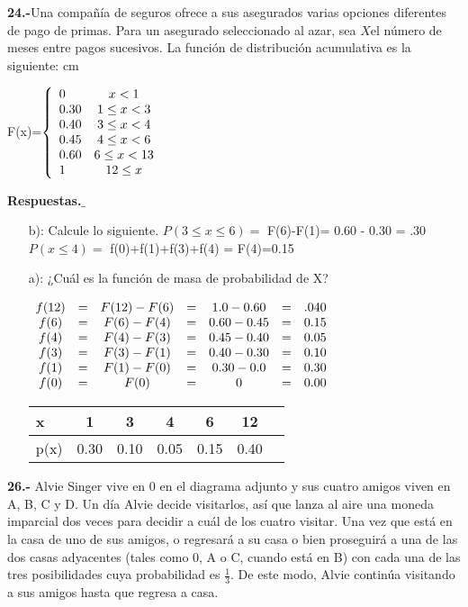 \documentclass[12pt, letterpaper, spanish]{article}
\newcommand{\jump}{\vskip 0.01cm}
\begin{document}
\textbf{24.-}Una compañía de seguros ofrece a sus asegurados varias opciones diferentes de pago de primas. Para un asegurado seleccionado al azar, sea $X$el número de meses entre pagos sucesivos. La función de distribución acumulativa es la siguiente: cm
\begin{center}
F(x)=$\left\{\begin{array}{l c}
    0 & x<1\\
    0.30 & 1 \leq x < 3\\
    0.40 & 3 \leq x < 4\\
    0.45 & 4 \leq x < 6\\
    0.60 & 6 \leq x < 13\\
    1    & 12 \leq x\\
\end{array}\right.$
\end{center} \jump
\textbf{Respuestas.$\_$}\jump
\begin{itemize}
    \item[b):] Calcule lo siguiente.
    \jump $P(3\leq x \leq 6) =$ F(6)-F(1)= 0.60 - 0.30 = .30
    \jump $P(x \leq 4) =$ f(0)+f(1)+f(3)+f(4) = F(4)=0.15
    \item[a):] ¿Cuál es la función de masa de probabilidad de X?
    \jump \begin{center} $\begin{array}{c c c c c c c}
        f(12)&=&F(12)-F(6)&=&1.0 - 0.60&=&.040\\
        f(6)&=&F(6)-F(4)&=&0.60 - 0.45&=&0.15\\
        f(4)&=&F(4)-F(3)&=&0.45 - 0.40&=&0.05\\
        f(3)&=&F(3)-F(1)&=&0.40 - 0.30&=&0.10\\
        f(1)&=&F(1)-F(0)&=&0.30 - 0.0&=&0.30\\
        f(0)&=&F(0)&=&0 &=&0.00\\
    \end{array}$  \jump
    \begin{tabular}{l|c c c c c c}
        x&1&3&4&6&12\\
        \hline
        p(x)&0.30&0.10&0.05&0.15&0.40\\
    \end{tabular}
\end{center}
\end{itemize}
\textbf{26.-} Alvie Singer vive en 0 en el diagrama adjunto y sus cuatro amigos viven en A, B, C y D. Un día Alvie decide visitarlos, así que lanza al aire una moneda imparcial dos veces para decidir a cuál de los cuatro visitar. Una vez que está en la casa de uno de sus amigos, o regresará a su casa o bien proseguirá a una de las dos casas adyacentes (tales como 0, A o C, cuando está en B) con cada una de las tres posibilidades cuya probabilidad es $\displaystyle\frac{1}{3}$. De este modo, Alvie continúa visitando a sus amigos hasta que regresa a casa.
\end{document}
